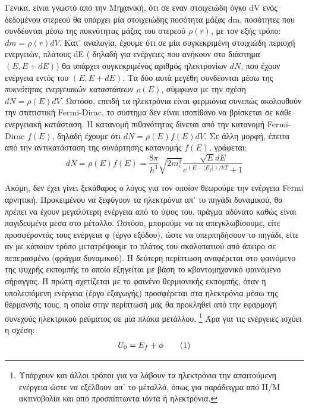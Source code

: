 \documentclass[a4paper]{article}
\newcommand\numberthis{\addtocounter{equation}{1}\tag{\theequation}}
\begin{document}
Γενικα, είναι γνωστό από την Μηχανική, ότι σε εναν στοιχειώδη όγκο dV ενός δεδομένου στερεού θα υπάρχει μία στοιχειώδης ποσότητα μάζας dm, ποσότητες που συνδέονται μέσω της πυκνότητας μάζας του στερεού $\rho(r)$, με τον εξής τρόπο: $dm=\rho(r) dV$.
 Κατ' αναλογία, έχουμε ότι σε μία συγκεκριμένη στοιχιώδη περιοχή ενεργειών, πλάτους dE ( δηλαδή για ενέργειες που ανήκουν στο διάστημα $(E,E+dE)$) θα υπάρχει συγκεκριμένος αριθμός ηλεκτρονίων $dN$, που έχουν ενέργεια εντός του $(E,E+dE)$. Τα δύο αυτά μεγέθη συνδέονται μέσω της \textit{πυκνότητας ενεργειακών καταστάσεων} $\rho (E)$, σύμφωνα με την σχέση $dN=\rho(E)dV$. Ωστόσο, επειδή τα ηλεκτρόνια είναι φερμιόνια συνεπώς ακολουθούν την στατιστική Fermi-Dirac, το σύστημα δεν είναι ισοπίθανο να βρίσκεται σε κάθε ενεργειακή κατάσταση. Η κατανομή πιθανότητας δίνεται από την κατανομή Fermi-Dirac $f(E)$, δηλαδή έχουμε ότι $dN=\rho(E)f(E)dV$. Σε άλλη μορφή, έπειτα από την αντικατάσταση της συνάρτησης κατανομής $f(E)$, γράφεται: 
\begin{equation}\label{2}
dN=\rho(E)f(E) = \frac{8\pi}{h^3}\sqrt{2m_e^3}\frac{\sqrt{E}dE}{e^{(E-|E_f|)/kT}+1}
\end{equation}



Ακόμη, δεν έχει γίνει ξεκάθαρος ο λόγος για τον οποίον θεωρούμε την ενέργεια Fermi αρνητική. Προκειμένου να ξεφύγουν τα ηλεκτρόνια απ' το πηγάδι δυναμικού, 
θα πρέπει να έχουν μεγαλύτερη ενέργεια από το ύψος του, πράγμα αδύνατο καθώς είναι παγιδευμένα μεσα στο μέταλλο. Ωστόσο, μπορούμε να τα απεγκλωβίσουμε, είτε προσφέροντάς τους ενέργεια φ (έργο εξόδου), ώστε να υπερπηδήσουν το πηγάδι, είτε αν με κάποιον τρόπο μετατρέψουμε το πλάτος του σκαλοπατιού από άπειρο σε πεπερασμένο (φράγμα δυναμικού). Η δεύτερη περίπτωση αναφέρεται στο φαινόμενο της ψυχρής εκπομπής το οποίο εξηγείται με βάση το κβαντομηχανικό φαινόμενο σήραγγας. Η πρώτη σχετίζεται με το φαινένο θερμιονικής εκπομπής, όταν η υπολειπόμενη ενέργεια (έργο εξαγωγής) προσφέρεται στα ηλεκτρόνια μέσω της θέρμανσής τους, η οποία στην περίπτωσή μας θα προκληθεί από την εφαρμογή συνεχούς ηλεκτρικού ρεύματος σε μία πλάκα μετάλλου.
\footnote{Υπάρχουν και άλλοι τρόποι για να λάβουν τα ηλεκτρόνια την απαιτούμενη ενέργεια ώστε να εξέλθουν απ΄ το μέταλλό, όπως για παράδειγμα από Η/Μ ακτινοβολία και από προσπίπτωντα ιόντα ή ηλεκτρόνια.} 
Άρα για τις ενέργειες ισχύει η σχέση:
\begin{align*}\label{3}
U_0 = E_f + \phi \numberthis
\end{align*}
\end{document}
